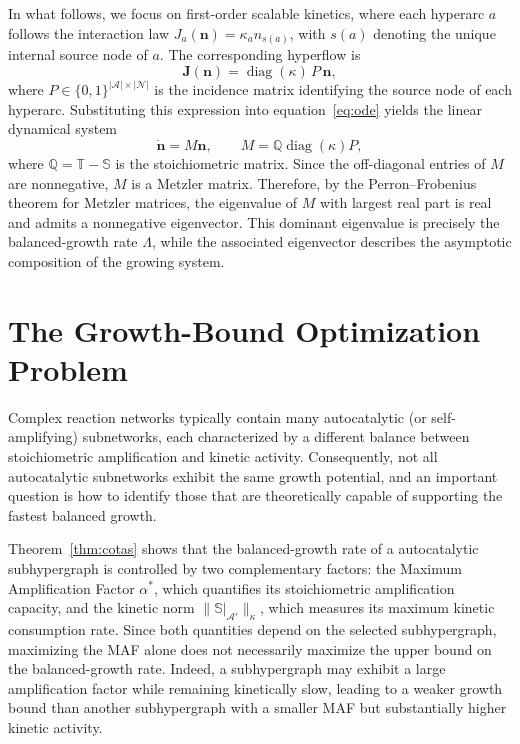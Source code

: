 \documentclass[a4paper,11pt,reqno]{amsart}
\begin{document}
In what follows, we focus on first-order scalable kinetics, where each
hyperarc $a$ follows the interaction law
$J_a(\mathbf{n})=\kappa_a n_{s(a)}$, with $s(a)$ denoting the unique internal
source node of $a$. The corresponding hyperflow is
$$
\mathbf{J}(\mathbf{n})
=
\operatorname{diag}(\kappa)\,P\,\mathbf{n},
$$
where $P\in\{0,1\}^{|\mathcal{A}|\times|\mathcal{N}|}$ is the incidence matrix
identifying the source node of each hyperarc. Substituting this expression into
equation~\eqref{eq:ode} yields the linear dynamical system
\begin{equation}
\dot{\mathbf{n}}
=
M\mathbf{n},
\qquad
M=
\mathbb{Q}\operatorname{diag}(\kappa)P,
\label{eq:operador-M}
\end{equation}
where $\mathbb{Q}=\mathbb{T}-\mathbb{S}$ is the stoichiometric matrix. Since
the off-diagonal entries of $M$ are nonnegative, $M$ is a Metzler matrix.
Therefore, by the Perron--Frobenius theorem for Metzler matrices, the
eigenvalue of $M$ with largest real part is real and admits a nonnegative
eigenvector. This dominant eigenvalue is precisely the balanced-growth rate
$\Lambda$, while the associated eigenvector describes the asymptotic
composition of the growing system.





\section{The Growth-Bound Optimization Problem}\label{sec:problema}

Complex reaction networks typically contain many autocatalytic (or self-amplifying) 
subnetworks, each characterized by a different balance between
stoichiometric amplification and kinetic activity. Consequently, not all
autocatalytic subnetworks exhibit the same growth potential, and an
important question is how to identify those that are theoretically capable of
supporting the fastest balanced growth.

Theorem~\ref{thm:cotas} shows that the balanced-growth rate of a
autocatalytic subhypergraph is controlled by two complementary factors: the
Maximum Amplification Factor $\alpha^*$, which quantifies its stoichiometric
amplification capacity, and the kinetic norm
$\|\mathbb{S}|_{\mathcal{A}'}\|_{\kappa}$, which measures its maximum kinetic
consumption rate. Since both quantities depend on the selected subhypergraph,
maximizing the MAF alone does not necessarily maximize the upper bound on the
balanced-growth rate. Indeed, a subhypergraph may exhibit a large
amplification factor while remaining kinetically slow, leading to a weaker
growth bound than another subhypergraph with a smaller MAF but substantially
higher kinetic activity.
\end{document}

